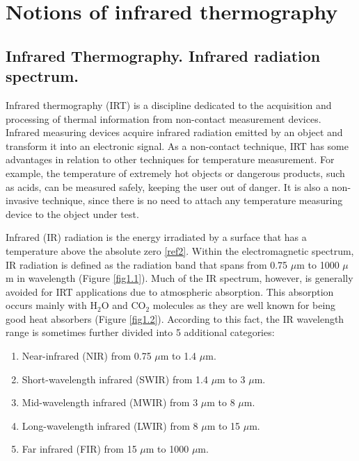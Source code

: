 \pagestyle{standard}

\chapter{Notions of infrared thermography}\label{chapter1}

	\thispagestyle{chapter-first-page}
	
	\section{Infrared Thermography. Infrared radiation spectrum.}\label{section1.1}
	
		Infrared thermography (IRT) is a discipline dedicated to the acquisition and processing of thermal information from non-contact measurement devices. Infrared measuring devices acquire infrared radiation emitted by an object and transform it into an electronic signal. As a non-contact technique, IRT has some advantages in relation to other techniques for temperature measurement. For example, the temperature of extremely hot objects or dangerous products, such as acids, can be measured safely, keeping the user out of danger. It is also a non-invasive technique, since there is no need to attach any temperature measuring device to the object under test.
		
		Infrared (IR) radiation is the energy irradiated by a surface that has a temperature above the absolute zero \ref{ref2}. Within the electromagnetic spectrum, IR radiation is defined as the radiation band that spans from 0.75 $\mu$m to 1000 $\mu$m in wavelength (Figure \ref{fig1.1}). Much of the IR spectrum, however, is generally avoided for IRT applications due to atmospheric absorption. This absorption occurs mainly with H$_{2}$O and CO$_{2}$ molecules as they are well known for being good heat absorbers (Figure \ref{fig1.2}). According to this fact, the IR wavelength range is sometimes further divided into 5 additional categories:

		\begin{enumerate}[label={\Roman*.}]
			\item Near-infrared (NIR) from 0.75 $\mu$m to 1.4 $\mu$m.
			\item Short-wavelength infrared (SWIR) from 1.4 $\mu$m to 3 $\mu$m.
			\item Mid-wavelength infrared (MWIR) from 3 $\mu$m to 8 $\mu$m.
			\item Long-wavelength infrared (LWIR) from 8 $\mu$m to 15 $\mu$m.
			\item Far infrared (FIR) from 15 $\mu$m to 1000 $\mu$m.
		\end{enumerate}
		
